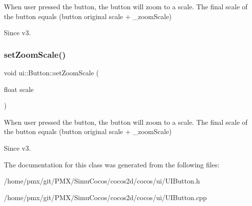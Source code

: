 When user pressed the button, the button will zoom to a scale. The final scale of the button equals (button original scale + \+\_\+zoom\+Scale) 

\begin{DoxySince}{Since}
v3. 
\end{DoxySince}
\mbox{\label{classui_1_1Button_a98d035c3a2063f057715a9131174e3e0}} 
\subsubsection{\texorpdfstring{set\+Zoom\+Scale()}{setZoomScale()}\hspace{0.1cm}{\footnotesize\ttfamily [2/2]}}
{\footnotesize\ttfamily void ui\+::\+Button\+::set\+Zoom\+Scale (\begin{DoxyParamCaption}\item[{float}]{scale }\end{DoxyParamCaption})}



When user pressed the button, the button will zoom to a scale. The final scale of the button equals (button original scale + \+\_\+zoom\+Scale) 

\begin{DoxySince}{Since}
v3. 
\end{DoxySince}


The documentation for this class was generated from the following files\+:\begin{DoxyCompactItemize}
\item 
/home/pmx/git/\+P\+M\+X/\+Simu\+Cocos/cocos2d/cocos/ui/U\+I\+Button.\+h\item 
/home/pmx/git/\+P\+M\+X/\+Simu\+Cocos/cocos2d/cocos/ui/U\+I\+Button.\+cpp\end{DoxyCompactItemize}
